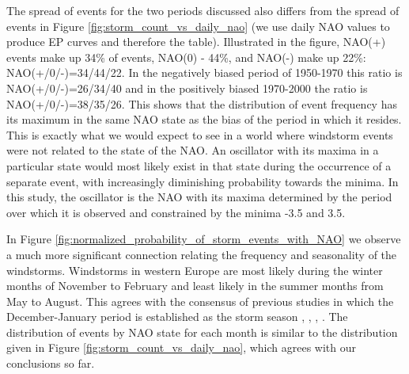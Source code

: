         The spread of events for the two periods discussed also differs from the spread of events in Figure \ref{fig:storm_count_vs_daily_nao} (we use daily NAO values to produce EP curves and therefore the table). Illustrated in the figure, NAO(+) events make up 34\% of events, NAO(0) - 44\%, and NAO(-) make up 22\%: NAO(+/0/-)=34/44/22. In the negatively biased period of 1950-1970 this ratio is NAO(+/0/-)=26/34/40 and in the positively biased 1970-2000 the ratio is NAO(+/0/-)=38/35/26. This shows that the distribution of event frequency has its maximum in the same NAO state as the bias of the period in which it resides. This is exactly what we would expect to see in a world where windstorm events were not related to the state of the NAO. An oscillator with its maxima in a particular state would most likely exist in that state during the occurrence of a separate event, with increasingly diminishing probability towards the minima. In this study, the oscillator is the NAO with its maxima determined by the period over which it is observed and constrained by the minima -3.5 and 3.5.

        In Figure \ref{fig:normalized_probability_of_storm_events_with_NAO} we observe a much more significant connection relating the frequency and seasonality of the windstorms. Windstorms in western Europe are most likely during the winter months of November to February and least likely in the summer months from May to August. This agrees with the consensus of previous studies in which the December-January period is established as the storm season \cite{Hurrell2003}, \cite{Pinto2009}, \cite{Palin2016}, \cite{Degenhardt2023}. 
        The distribution of events by NAO state for each month is similar to the distribution given in Figure \ref{fig:storm_count_vs_daily_nao}, which agrees with our conclusions so far. 

